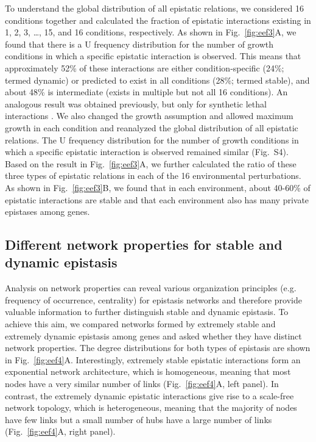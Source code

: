 \documentclass[10pt]{article}
\newcommand{\Fig}{Fig.}
\newcommand{\citep}{\cite}
\begin{document}
To understand the global distribution of all epistatic relations, we
considered 16 conditions together and calculated the fraction of
epistatic interactions existing in 1, 2, 3, \ldots, 15, and 16
conditions, respectively. As shown in \Fig~\ref{fig:eef3}A, we found that there is a
U frequency distribution for the number of growth conditions in which
a specific epistatic interaction is observed. This means that
approximately 52\% of these interactions are either condition-specific
(24\%; termed dynamic) or predicted to exist in all conditions (28\%;
termed stable), and about 48\% is intermediate (exists in multiple but not
all 16 conditions). An analogous result was obtained previously, but
only for synthetic lethal interactions \citep{Harrison2007}. We also changed the
growth assumption and allowed maximum growth in each condition and
reanalyzed the global distribution of all epistatic relations. The U
frequency distribution for the number of growth conditions in which a
specific epistatic interaction is observed remained similar
(\Fig~S4). Based on the result in \Fig~\ref{fig:eef3}A,
we further calculated the ratio of these three types of epistatic
relations in each of the 16 environmental perturbations. As shown in
\Fig~\ref{fig:eef3}B, we found that in
each environment, about 40-60\% of epistatic interactions are stable
and that each environment also has many private epistases among genes.



\subsection*{Different network properties for stable and dynamic epistasis}

Analysis on network properties can reveal various organization
principles (e.g. frequency of occurrence, centrality) for epistasis
networks \citep{Tong2004, Costanzo2010} and therefore provide valuable
information to further
distinguish stable and dynamic epistasis. To achieve this aim, we
compared networks formed by extremely stable and extremely dynamic
epistasis among genes and asked whether they have distinct network
properties. The degree distributions for both types of epistasis are
shown in \Fig~\ref{fig:eef4}A. Interestingly, extremely stable epistatic
interactions form an exponential network architecture, which is
homogeneous, meaning that most nodes have a very similar number of
links (\Fig~\ref{fig:eef4}A, left panel). In contrast, the extremely dynamic
epistatic interactions give rise to a scale-free network topology,
which is heterogeneous, meaning that the majority of nodes have few
links but a small number of hubs have a large number of links
(\Fig~\ref{fig:eef4}A, right panel).
\end{document}
